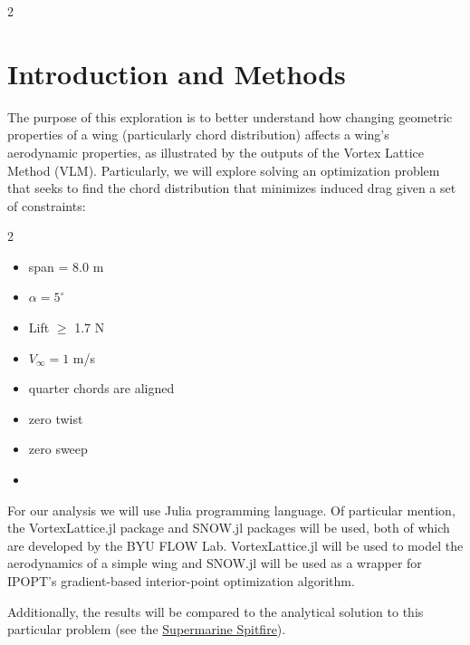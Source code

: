 \documentclass[11pt]{article}
\begin{document}
\begin{multicols}{2}

\raggedright
\section{Introduction and Methods}
\setlength{\parindent}{12pt}
The purpose of this exploration is to better understand how changing
geometric properties of a wing (particularly chord distribution)
affects a wing's aerodynamic properties, as illustrated by the 
outputs of the Vortex Lattice Method (VLM). Particularly, we will
explore solving an optimization problem that seeks to find the chord distribution
that minimizes induced drag given a set of constraints: \vspace{-10pt}

\begin{multicols}{2}
    \begin{itemize}
        \itemsep-6pt
        \item span = 8.0 m 
        \item $\alpha = 5^{\circ} $
        \item Lift $\geq$ 1.7 N 
        \item $V_{\infty} = 1$ m/s
        \item quarter chords are aligned
        \item zero twist
        \item zero sweep
        \item[]
    \end{itemize}
\end{multicols}
\vspace{-10pt}

For our analysis we will use Julia programming language. Of particular 
mention, the VortexLattice.jl package and SNOW.jl packages will be used,
both of which are developed by the BYU FLOW Lab. VortexLattice.jl will
be used to model the aerodynamics of a simple wing and SNOW.jl will be used as 
a wrapper for IPOPT's gradient-based interior-point optimization algorithm. \par

Additionally, the results will be compared to the analytical solution 
to this particular problem (see the 
\href{https://en.wikipedia.org/wiki/Supermarine_Spitfire}{Supermarine 
Spitfire}).


\end{multicols}
\end{document}
